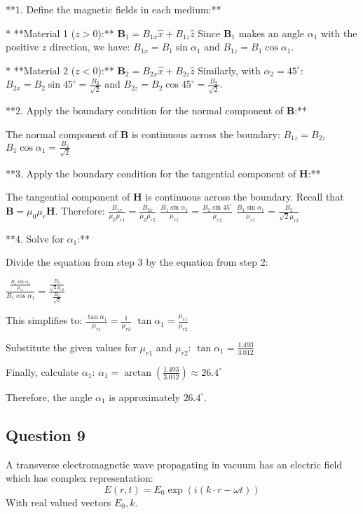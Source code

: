 \documentclass{article}
\begin{document}
**1. Define the magnetic fields in each medium:**

* **Material 1 ($z>0$):** 
   $\mathbf{B}_1 = B_{1x} \hat{x} + B_{1z} \hat{z}$ 
   Since $\mathbf{B}_1$ makes an angle $\alpha_1$ with the positive $z$ direction, we have:
   $B_{1x} = B_1 \sin \alpha_1$ and $B_{1z} = B_1 \cos \alpha_1$.

* **Material 2 ($z<0$):** 
   $\mathbf{B}_2 = B_{2x} \hat{x} + B_{2z} \hat{z}$
   Similarly, with $\alpha_2 = 45^\circ$:
   $B_{2x} = B_2 \sin 45^\circ = \frac{B_2}{\sqrt{2}}$ and $B_{2z} = B_2 \cos 45^\circ = \frac{B_2}{\sqrt{2}}$.

**2. Apply the boundary condition for the normal component of $\mathbf{B}$:**

The normal component of $\mathbf{B}$ is continuous across the boundary:
$B_{1z} = B_{2z}$
$B_1 \cos \alpha_1 = \frac{B_2}{\sqrt{2}}$  

**3. Apply the boundary condition for the tangential component of $\mathbf{H}$:**

The tangential component of $\mathbf{H}$ is continuous across the boundary. Recall that $\mathbf{B} = \mu_0 \mu_r \mathbf{H}$. Therefore:
$\frac{B_{1x}}{\mu_0 \mu_{r1}} = \frac{B_{2x}}{\mu_0 \mu_{r2}}$
$\frac{B_1 \sin \alpha_1}{\mu_{r1}} = \frac{B_2 \sin 45^\circ}{\mu_{r2}}$
$\frac{B_1 \sin \alpha_1}{\mu_{r1}} = \frac{B_2}{\sqrt{2} \mu_{r2}}$

**4. Solve for $\alpha_1$:**

Divide the equation from step 3 by the equation from step 2:

$\frac{\frac{B_1 \sin \alpha_1}{\mu_{r1}}}{B_1 \cos \alpha_1} = \frac{\frac{B_2}{\sqrt{2} \mu_{r2}}}{\frac{B_2}{\sqrt{2}}}$

This simplifies to:
$\frac{\tan \alpha_1}{\mu_{r1}} = \frac{1}{\mu_{r2}}$
$\tan \alpha_1 = \frac{\mu_{r1}}{\mu_{r2}}$

Substitute the given values for $\mu_{r1}$ and $\mu_{r2}$:
$\tan \alpha_1 = \frac{1.493}{3.012}$

Finally, calculate $\alpha_1$:
$\alpha_1 = \arctan \left( \frac{1.493}{3.012} \right) \approx 26.4^\circ$

Therefore, the angle $\alpha_1$ is approximately $26.4^\circ$.


\subsection{Question 9}
A transverse electromagnetic wave propagating in vacuum has an electric field which has complex representation:
\[
E(r, t) = E_0 \exp(i (k \cdot r - \omega t))
\]
With real valued vectors \(E_0, k\).
\end{document}
